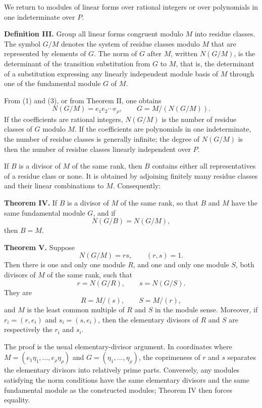 \documentclass[11pt]{article}
\begin{document}
We return to modules of linear forms over rational integers or over polynomials in one indeterminate over $P$.

\textbf{Definition III.} Group all linear forms congruent modulo $M$ into residue classes. The symbol $G/M$ denotes the system of residue classes modulo $M$ that are represented by elements of $G$. The norm of $G$ after $M$, written $N(G/M)$, is the determinant of the transition substitution from $G$ to $M$, that is, the determinant of a substitution expressing any linearly independent module basis of $M$ through one of the fundamental module $G$ of $M$.

From (1) and (3), or from Theorem II, one obtains
\begin{equation}
  N(G/M)=e_1e_2\cdots e_\rho,
  \qquad
  G=M/(N(G/M)).                                                     \tag{9}
\end{equation}
If the coefficients are rational integers, $N(G/M)$ is the number of residue classes of $G$ modulo $M$. If the coefficients are polynomials in one indeterminate, the number of residue classes is generally infinite; the degree of $N(G/M)$ is then the number of residue classes linearly independent over $P$.

If $B$ is a divisor of $M$ of the same rank, then $B$ contains either all representatives of a residue class or none. It is obtained by adjoining finitely many residue classes and their linear combinations to $M$. Consequently:

\textbf{Theorem IV.} If $B$ is a divisor of $M$ of the same rank, so that $B$ and $M$ have the same fundamental module $G$, and if
\[
  N(G/B)=N(G/M),
\]
then $B=M$.

\textbf{Theorem V.} Suppose
\begin{equation}
  N(G/M)=rs,\qquad (r,s)=1.                                      \tag{10}
\end{equation}
Then there is one and only one module $R$, and one and only one module $S$, both divisors of $M$ of the same rank, such that
\[
  r=N(G/R),\qquad s=N(G/S).
\]
They are
\begin{equation}
  R=M/(s),
  \qquad S=M/(r),                                                  \tag{11}
\end{equation}
and $M$ is the least common multiple of $R$ and $S$ in the module sense. Moreover, if $r_i=(r,e_i)$ and $s_i=(s,e_i)$, then the elementary divisors of $R$ and $S$ are respectively the $r_i$ and $s_i$.

The proof is the usual elementary-divisor argument. In coordinates where $M=(e_1\eta_1,\ldots,e_\rho\eta_\rho)$ and $G=(\eta_1,\ldots,\eta_\rho)$, the coprimeness of $r$ and $s$ separates the elementary divisors into relatively prime parts. Conversely, any modules satisfying the norm conditions have the same elementary divisors and the same fundamental module as the constructed modules; Theorem IV then forces equality.
\end{document}
